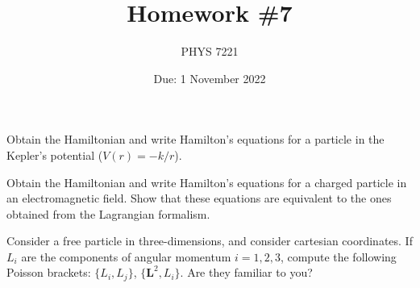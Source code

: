 \documentclass{jhwhw}
\author{PHYS 7221}
\title{Homework \#7}
\date{Due: 1 November 2022}
\begin{document}
Obtain the Hamiltonian and write Hamilton's equations for a particle in the Kepler's potential ($V(r) = - k / r$).

Obtain the Hamiltonian and write Hamilton's equations for a charged particle in an electromagnetic field. Show that these equations are equivalent to the ones obtained from the Lagrangian formalism.

Consider a free particle in three-dimensions, and consider cartesian coordinates. If $L_{i}$ are the components of angular momentum $i = 1,2,3$, compute the following Poisson brackets: $\{L_{i},L_{j}\}$, $\{\mathbf L^{2}, L_{i}\}$.
Are they familiar to you?
\end{document}
